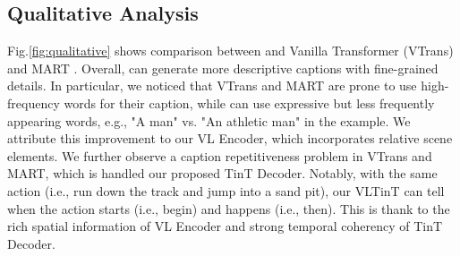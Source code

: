 \documentclass[letterpaper]{article} \usepackage{aaai23}  \usepackage{times}  \usepackage{helvet}  \usepackage{courier}  \usepackage[hyphens]{url}  \usepackage{graphicx} \urlstyle{rm} \def\UrlFont{\rm}  \usepackage{natbib}  \usepackage{caption} \frenchspacing  \setlength{\pdfpagewidth}{8.5in}  \setlength{\pdfpageheight}{11in}  \usepackage{algorithm}
\newcommand{\encoder}{VL Encoder\xspace}
\begin{document}
\subsection{Qualitative Analysis}
Fig.\ref{fig:qualitative} shows comparison between \model and Vanilla Transformer (VTrans) \cite{zhou2018end} and MART \cite{lei2020mart}. Overall, \model can generate more descriptive captions with fine-grained details. In particular, we noticed that VTrans and MART are prone to use high-frequency words for their caption, while \model can use expressive but less frequently appearing words, e.g., 
"A man" vs. "An athletic man" in the example. We attribute this improvement to our \encoder, which incorporates relative scene elements. We further observe a caption repetitiveness problem in VTrans and MART, which is handled our proposed TinT Decoder. Notably, with the same action (i.e.,  run down the track and jump into a sand pit), our VLTinT can tell when the action starts (i.e., begin) and happens (i.e., then). This is thank to the rich spatial information of \encoder and strong temporal coherency of TinT Decoder. 
\end{document}
